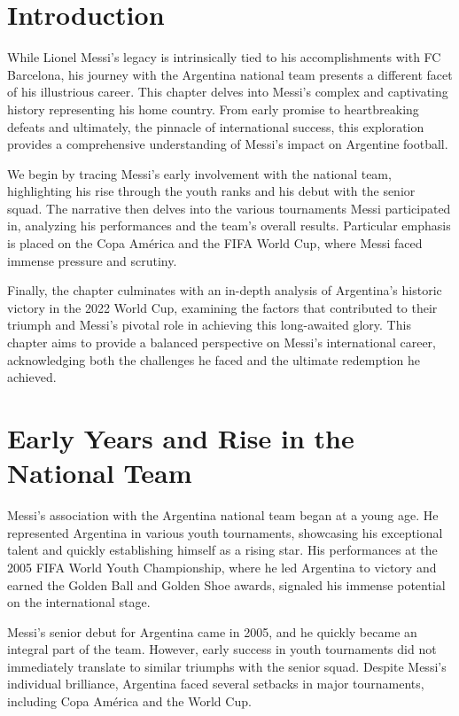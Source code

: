 \section{Introduction}

While Lionel Messi's legacy is intrinsically tied to his accomplishments with 
FC Barcelona, his journey with the Argentina national team presents a different 
facet of his illustrious career. This chapter delves into Messi's complex and 
captivating history representing his home country.
From early promise to heartbreaking defeats and ultimately, the pinnacle of 
international success, this exploration provides a comprehensive understanding 
of Messi's impact on Argentine football. 

We begin by tracing Messi's early involvement with the national team, 
highlighting his rise through the youth ranks \parencite[e.g.,][]{messi2005u20wc} 
and his debut with the senior squad.
The narrative then delves into the various tournaments Messi participated in, 
analyzing his performances and the team's overall results. Particular emphasis 
is placed on the Copa América and the FIFA World Cup, where Messi faced immense 
pressure and scrutiny.

Finally, the chapter culminates with an in-depth analysis of Argentina's 
historic victory in the 2022 World Cup, examining the factors that contributed 
to their triumph and Messi's pivotal role in achieving this long-awaited glory.
This chapter aims to provide a balanced perspective on Messi's international 
career, acknowledging both the challenges he faced and the ultimate redemption 
he achieved.

\section{Early Years and Rise in the National Team}

Messi's association with the Argentina national team began at a young age.
He represented Argentina in various youth tournaments, showcasing his 
exceptional talent and quickly establishing himself as a rising star.
His performances at the 2005 FIFA World Youth Championship, where he led 
Argentina to victory and earned the Golden Ball and Golden Shoe awards, 
signaled his immense potential on the international stage. 

Messi's senior debut for Argentina came in 2005, and he quickly became an 
integral part of the team. However, early success in youth tournaments did 
not immediately translate to similar triumphs with the senior squad.
Despite Messi's individual brilliance, Argentina faced several setbacks in 
major tournaments, including Copa América and the World Cup. 

